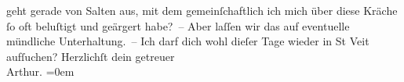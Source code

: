 \begin{ledgroupsized}[t]{13cm}
               geht gerade von Salten aus, mit dem
               gemeinſchaftlich ich mich über diese Kräche \introOben{}ſo oft\introOben{} beluſtigt
               und geärgert habe? – Aber laſſen wir das auf eventuelle mündliche Unterhaltung. – Ich
               darf dich wohl dieſer Tage wieder in St Veit
               aufſuchen?\pend
           \pstart
           Herzlichſt dein getreuer{\\[\baselineskip]}\spacefill\mbox{Arthur.}\pend
           \leftskip=0em{}
         
         \endnumbering{}\end{ledgroupsized}  \newcommand{\dateiname}{L01338}\newcommand{\titel}{Arthur Schnitzler an Hermann Bahr, 10. 11. 1903}\newcommand{\editorInnen}{ Kurt Ifkovits,  Martin Anton Müller}
      